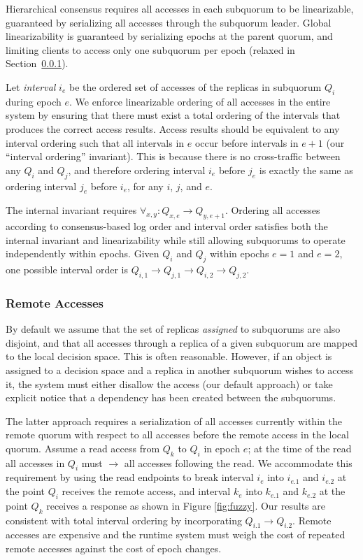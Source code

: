 \documentclass[sigconf]{acmart}
\begin{document}
Hierarchical consensus requires all accesses in each subquorum to be linearizable,
guaranteed by serializing all accesses through the subquorum leader.
Global linearizability is guaranteed by serializing epochs at the parent
quorum, and limiting clients to access only one subquorum per epoch (relaxed
in Section~\ref{sec:remote}).

Let \emph{interval} $i_e$ be the ordered set of accesses of the replicas in subquorum
$Q_i$ during epoch $e$.
We enforce linearizable ordering of all accesses in the entire system by
ensuring that there must exist a total ordering of the intervals that produces the correct
access results.
Access results should be equivalent to any interval ordering
such that all intervals in $e$ occur before intervals in $e+1$ (our ``interval
ordering'' invariant).
This is because there is no cross-traffic between any $Q_i$ and $Q_j$, and therefore
ordering interval $i_e$ before $j_e$ is exactly the same as ordering interval $j_e$
before $i_e$, for any $i$, $j$, and $e$.

The internal invariant requires $\forall_{x,y} : Q_{x,e} \rightarrow Q_{y,e+1}$.
Ordering all accesses according to consensus-based log order and interval order satisfies both the
internal invariant and linearizability  while still allowing subquorums to operate
independently within epochs.
Given $Q_i$ and $Q_j$ within epochs $e=1$ and $e=2$, one possible interval order is
$Q_{i,1} \rightarrow Q_{j,1} \rightarrow Q_{i,2} \rightarrow Q_{j,2}$.

\subsubsection{Remote Accesses}
\label{sec:remote}

By default we assume that the set of replicas \emph{assigned} to subquorums are also
disjoint, and that all accesses through a replica of a given subquorum are mapped to the
local decision space.
This is often reasonable.
However, if an object is assigned to a decision space and a replica in another subquorum
wishes to
access it, the system must either disallow the access (our default approach) or take
explicit notice that a dependency has been created between the subquorums.

The latter approach requires a serialization of all accesses currently within the remote
quorum with respect to all accesses before the remote access in the local quorum.
Assume a read access from $Q_k$ to $Q_i$ in epoch $e$; at the time of the read all
accesses in $Q_i$ must $\rightarrow$ all accesses following the read.
We accommodate this requirement by using the read endpoints to break interval $i_e$ into
$i_{e.1}$ and $i_{e.2}$ at the point $Q_i$ receives the remote access, and interval $k_e$
into $k_{e.1}$ and $k_{e.2}$ at the point $Q_k$ receives a response as shown in
Figure \ref{fig:fuzzy}.
Our results are consistent with total interval ordering by incorporating $Q_{i.1}
\rightarrow Q_{i.2}$.
Remote accesses are expensive and the runtime system must weigh the cost of repeated
remote accesses against the cost of epoch changes.
\end{document}
